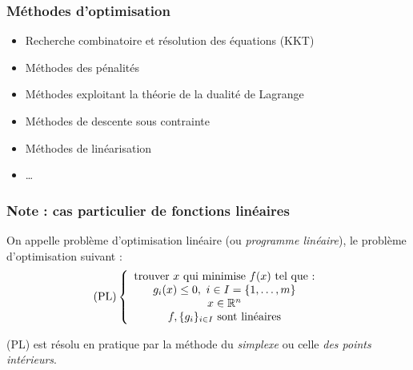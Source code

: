 \begin{frame}
  \frametitle{Méthodes d'optimisation}

  \begin{itemize}
  \item Recherche combinatoire et résolution des équations (KKT)
  \item Méthodes des pénalités
  \item Méthodes exploitant la théorie de la dualité de Lagrange
  \item Méthodes de descente sous contrainte
  \item Méthodes de linéarisation
  \item \dots
  \end{itemize}
  
\end{frame}

\begin{frame}
  \frametitle{Note : cas particulier de fonctions linéaires}

  On appelle problème d'optimisation linéaire (ou \emph{programme linéaire}),
  le problème d'optimisation suivant : 
  \[
  \text{(PL)} \left\{
  \begin{array}{c}
    \text{trouver} \ x \ \text{qui minimise} \ f(x) \ \text{tel que :} \\
    g_i(x) \leq 0, \ i \in I = \{1, \dots, m\} \\
    x \in {\ensuremath\mathbb{R}}^n \\
    f, \{g_i\}_{i \in I} \ \text{sont linéaires} \\
  \end{array}
  \right.
  \]

  (PL) est résolu en pratique par la méthode du \emph{simplexe}
  ou celle \emph{des points intérieurs}.
\end{frame}
